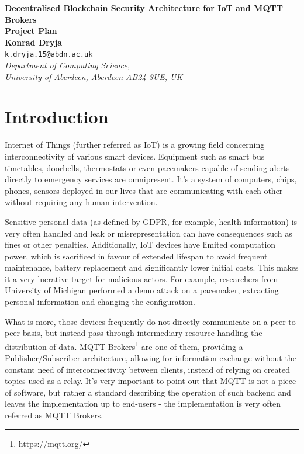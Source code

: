 \documentclass[a4paper,12pt]{article}
\begin{document}
\begin{center}
{\Large\bf{Decentralised Blockchain Security Architecture for IoT and MQTT Brokers}} \\
      \vspace{5.0mm}
{\Large\bf{Project Plan}} \\
      \vspace{8mm}
      {\large\bf{Konrad Dryja}}  \\
      \vspace{5.0mm}
       {\tt k.dryja.15@abdn.ac.uk} \\
      \vspace{5.0mm}
      {\em Department of Computing Science,\\
       University of Aberdeen, Aberdeen AB24 3UE, UK} 
\end{center}


\section*{Introduction}

Internet of Things (further referred as IoT) is a growing field concerning interconnectivity of various smart devices. Equipment such as smart bus timetables, doorbells, thermostats or even pacemakers capable of sending alerts directly to emergency services are omnipresent. It's a system of computers, chips, phones, sensors deployed in our lives that are communicating with each other without requiring any human intervention.

Sensitive personal data (as defined by GDPR\cite{EUdataregulations2018}, for example, health information) is very often handled and leak or misrepresentation can have consequences such as fines or other penalties. Additionally, IoT devices have limited computation power, which is sacrificed in favour of extended lifespan to avoid frequent maintenance, battery replacement and significantly lower initial costs. This makes it a very lucrative target for malicious actors. For example, researchers from University of Michigan performed a demo attack on a pacemaker, extracting personal information and changing the configuration\cite{4531149}.

What is more, those devices frequently do not directly communicate on a peer-to-peer basis, but instead pass through intermediary resource handling the distribution of data. MQTT Brokers\footnote{\url{https://mqtt.org/}} are one of them, providing a Publisher/Subscriber architecture, allowing for information exchange without the constant need of interconnectivity between clients, instead of relying on created topics used as a relay. It's very important to point out that MQTT is not a piece of software, but rather a standard describing the operation of such backend and leaves the implementation up to end-users - the implementation is very often referred as MQTT Brokers.
\end{document}
